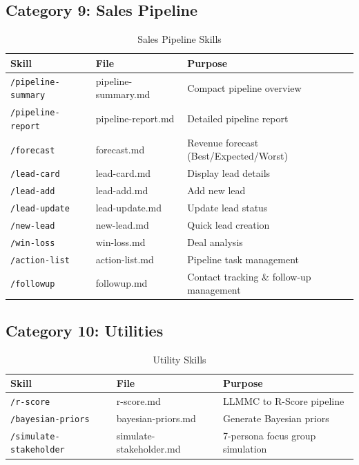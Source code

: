 \subsection{Category 9: Sales Pipeline}

\begin{table}[htbp]
\centering
\begin{tabular}{|l|l|p{6cm}|}
\hline
\textbf{Skill} & \textbf{File} & \textbf{Purpose} \\
\hline
\texttt{/pipeline-summary} & pipeline-summary.md & Compact pipeline overview \\
\texttt{/pipeline-report} & pipeline-report.md & Detailed pipeline report \\
\texttt{/forecast} & forecast.md & Revenue forecast (Best/Expected/Worst) \\
\texttt{/lead-card} & lead-card.md & Display lead details \\
\texttt{/lead-add} & lead-add.md & Add new lead \\
\texttt{/lead-update} & lead-update.md & Update lead status \\
\texttt{/new-lead} & new-lead.md & Quick lead creation \\
\texttt{/win-loss} & win-loss.md & Deal analysis \\
\texttt{/action-list} & action-list.md & Pipeline task management \\
\texttt{/followup} & followup.md & Contact tracking \& follow-up management \\
\hline
\end{tabular}
\caption{Sales Pipeline Skills}
\end{table}


\subsection{Category 10: Utilities}

\begin{table}[htbp]
\centering
\begin{tabular}{|l|l|p{6cm}|}
\hline
\textbf{Skill} & \textbf{File} & \textbf{Purpose} \\
\hline
\texttt{/r-score} & r-score.md & LLMMC to R-Score pipeline \\
\texttt{/bayesian-priors} & bayesian-priors.md & Generate Bayesian priors \\
\texttt{/simulate-stakeholder} & simulate-stakeholder.md & 7-persona focus group simulation \\
\hline
\end{tabular}
\caption{Utility Skills}
\end{table}



